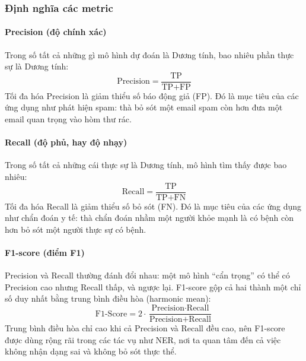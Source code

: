 \begin{center}
\label{fig:confusion_matrix}
\end{center}

\subsubsection{Định nghĩa các metric}
\paragraph{Precision (độ chính xác)} Trong số tất cả những gì mô hình dự đoán là Dương tính, bao nhiêu phần thực sự là Dương tính:
$$ \text{Precision} = \frac{\text{TP}}{\text{TP} + \text{FP}} $$
Tối đa hóa Precision là giảm thiểu số báo động giả (FP). Đó là mục tiêu của các ứng dụng như phát hiện spam: thà bỏ sót một email spam còn hơn đưa một email quan trọng vào hòm thư rác.

\paragraph{Recall (độ phủ, hay độ nhạy)} Trong số tất cả những cái thực sự là Dương tính, mô hình tìm thấy được bao nhiêu:
$$ \text{Recall} = \frac{\text{TP}}{\text{TP} + \text{FN}} $$
Tối đa hóa Recall là giảm thiểu số bỏ sót (FN). Đó là mục tiêu của các ứng dụng như chẩn đoán y tế: thà chẩn đoán nhầm một người khỏe mạnh là có bệnh còn hơn bỏ sót một người thực sự có bệnh.

\paragraph{F1-score (điểm F1)} Precision và Recall thường đánh đổi nhau: một mô hình “cẩn trọng” có thể có Precision cao nhưng Recall thấp, và ngược lại. F1-score gộp cả hai thành một chỉ số duy nhất bằng trung bình điều hòa (harmonic mean):
$$ \text{F1-Score} = 2 \cdot \frac{\text{Precision} \cdot \text{Recall}}{\text{Precision} + \text{Recall}} $$
Trung bình điều hòa chỉ cao khi cả Precision và Recall đều cao, nên F1-score được dùng rộng rãi trong các tác vụ như NER, nơi ta quan tâm đến cả việc không nhận dạng sai và không bỏ sót thực thể.


